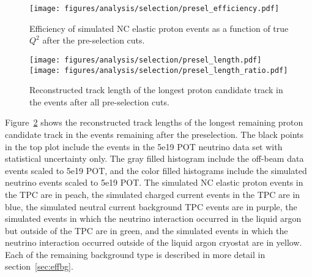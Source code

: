     \begin{figure}[ht]
      \centering
      \texttt{[image: figures/analysis/selection/presel\_efficiency.pdf]}
      \caption{Efficiency of simulated NC elastic proton events as a function
        of true $Q^2$ after the pre-selection cuts.}
      \label{fig:preseleff}
    \end{figure}
    \begin{figure}[ht]
      \centering
      \texttt{[image: figures/analysis/selection/presel\_length.pdf]} \\
      \texttt{[image: figures/analysis/selection/presel\_length\_ratio.pdf]}
      \caption{Reconstructed track length of the longest proton candidate track
      in the events after all pre-selection cuts.}
      \label{fig:presellength}
    \end{figure}

    Figure~\ref{fig:presellength} shows the reconstructed track lengths of the
    longest remaining proton candidate track in the events remaining after the
    preselection. The black points in the top plot include the events in the
    5e19 POT neutrino data set with statistical uncertainty only. The gray
    filled histogram include the off-beam data events scaled to 5e19 POT, and
    the color filled histograms include the simulated neutrino events scaled to
    5e19 POT. The simulated NC elastic proton events in the TPC are in peach,
    the simulated charged current events in the TPC are in blue, the simulated
    neutral current background TPC events are in purple, the simulated events
    in which the neutrino interaction occurred in the liquid argon but outside
    of the TPC are in green, and the simulated events in which the neutrino
    interaction occurred outside of the liquid argon cryostat are in yellow.
    Each of the remaining background type is described in more detail in
    section~\ref{sec:effbg}.

